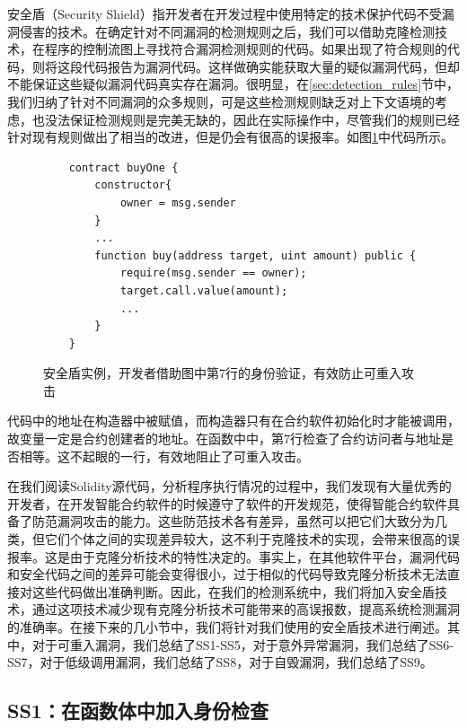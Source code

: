 安全盾（Security Shield）指开发者在开发过程中使用特定的技术保护代码不受漏洞侵害的技术。在确定针对不同漏洞的检测规则之后，我们可以借助克隆检测技术，在程序的控制流图上寻找符合漏洞检测规则的代码。如果出现了符合规则的代码，则将这段代码报告为漏洞代码。这样做确实能获取大量的疑似漏洞代码，但却不能保证这些疑似漏洞代码真实存在漏洞。很明显，在\ref{sec:detection_rules}节中，我们归纳了针对不同漏洞的众多规则，可是这些检测规则缺乏对上下文语境的考虑，也没法保证检测规则是完美无缺的，因此在实际操作中，尽管我们的规则已经针对现有规则做出了相当的改进，但是仍会有很高的误报率。如图\ref{fig:ss_example}中代码所示。
\begin{figure}
\begin{minipage}[htb]{1.0\linewidth}
    \begin{lstlisting}
    contract buyOne {
        constructor{
            owner = msg.sender
        }
        ...
        function buy(address target, uint amount) public {
            require(msg.sender == owner);
            target.call.value(amount);
            ...
        }
    }
    \end{lstlisting}
\end{minipage}
\vspace{-5mm}
\caption{安全盾实例，开发者借助图中第7行的身份验证，有效防止可重入攻击}
\label{fig:ss_example}
\end{figure}
代码中的地址在构造器中被赋值，而构造器只有在合约软件初始化时才能被调用，故变量一定是合约创建者的地址。在函数中中，第7行检查了合约访问者与地址是否相等。这不起眼的一行，有效地阻止了可重入攻击。

在我们阅读Solidity源代码，分析程序执行情况的过程中，我们发现有大量优秀的开发者，在开发智能合约软件的时候遵守了软件的开发规范，使得智能合约软件具备了防范漏洞攻击的能力。这些防范技术各有差异，虽然可以把它们大致分为几类，但它们个体之间的实现差异较大，这不利于克隆技术的实现，会带来很高的误报率。这是由于克隆分析技术的特性决定的。事实上，在其他软件平台，漏洞代码和安全代码之间的差异可能会变得很小，过于相似的代码导致克隆分析技术无法直接对这些代码做出准确判断。因此，在我们的检测系统中，我们将加入安全盾技术，通过这项技术减少现有克隆分析技术可能带来的高误报数，提高系统检测漏洞的准确率。在接下来的几小节中，我们将针对我们使用的安全盾技术进行阐述。其中，对于可重入漏洞，我们总结了SS1-SS5，对于意外异常漏洞，我们总结了SS6-SS7，对于低级调用漏洞，我们总结了SS8，对于自毁漏洞，我们总结了SS9。

\subsection{SS1：在函数体中加入身份检查}

